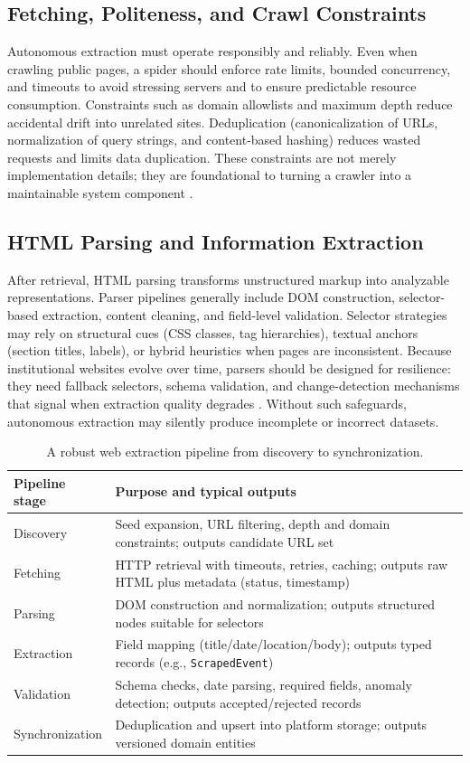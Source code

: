\subsection{Fetching, Politeness, and Crawl Constraints}
Autonomous extraction must operate responsibly and reliably. Even when crawling public pages, a spider should enforce rate limits, bounded concurrency, and timeouts to avoid stressing servers and to ensure predictable resource consumption. Constraints such as domain allowlists and maximum depth reduce accidental drift into unrelated sites. Deduplication (canonicalization of URLs, normalization of query strings, and content-based hashing) reduces wasted requests and limits data duplication. These constraints are not merely implementation details; they are foundational to turning a crawler into a maintainable system component \cite{Narayan2012}.

\subsection{HTML Parsing and Information Extraction}
After retrieval, HTML parsing transforms unstructured markup into analyzable representations. Parser pipelines generally include DOM construction, selector-based extraction, content cleaning, and field-level validation. Selector strategies may rely on structural cues (CSS classes, tag hierarchies), textual anchors (section titles, labels), or hybrid heuristics when pages are inconsistent. Because institutional websites evolve over time, parsers should be designed for resilience: they need fallback selectors, schema validation, and change-detection mechanisms that signal when extraction quality degrades \cite{Robbes2015}. Without such safeguards, autonomous extraction may silently produce incomplete or incorrect datasets.

\begin{table}[htbp]
\centering
\begin{tabular}{|p{110pt}|p{310pt}|}
\hline
\textbf{Pipeline stage} & \textbf{Purpose and typical outputs} \\
\hline
Discovery & Seed expansion, URL filtering, depth and domain constraints; outputs candidate URL set \\
\hline
Fetching & HTTP retrieval with timeouts, retries, caching; outputs raw HTML plus metadata (status, timestamp) \\
\hline
Parsing & DOM construction and normalization; outputs structured nodes suitable for selectors \\
\hline
Extraction & Field mapping (title/date/location/body); outputs typed records (e.g., \texttt{ScrapedEvent}) \\
\hline
Validation & Schema checks, date parsing, required fields, anomaly detection; outputs accepted/rejected records \\
\hline
Synchronization & Deduplication and upsert into platform storage; outputs versioned domain entities \\
\hline
\end{tabular}
\caption{A robust web extraction pipeline from discovery to synchronization.}
\label{tab:spider_pipeline}
\end{table}

